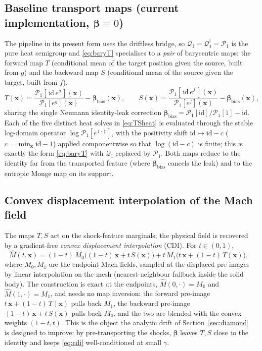 \documentclass[11pt]{article}
\theoremstyle{remark}
\newcommand{\xv}{\mathbf{x}}
\newcommand{\bt}{\boldsymbol{\beta}}
\begin{document}
\subsection{Baseline transport maps (current implementation, $\bt\equiv0$)}
\label{sec:baseline}
The pipeline in its present form uses the driftless bridge, so
$\mathcal{Q}_1=\mathcal{Q}_1^{\dagger}=\mathcal{P}_1$ is the pure heat semigroup and
\eqref{eq:baryT} specialises to a \emph{pair} of barycentric maps: the forward map
$T$ (conditional mean of the target position given the source, built from $g$) and
the backward map $S$ (conditional mean of the source given the target, built from
$f$),
\begin{equation}
\label{eq:TSheat}
T(\xv)=\frac{\mathcal{P}_1[\,\mathrm{id}\,e^{g}\,](\xv)}{\mathcal{P}_1[e^{g}](\xv)}-\boldsymbol{\beta}_{\mathrm{bias}}(\xv),
\qquad
S(\xv)=\frac{\mathcal{P}_1[\,\mathrm{id}\,e^{f}\,](\xv)}{\mathcal{P}_1[e^{f}](\xv)}-\boldsymbol{\beta}_{\mathrm{bias}}(\xv),
\end{equation}
sharing the single Neumann identity-leak correction
$\boldsymbol{\beta}_{\mathrm{bias}}=\mathcal{P}_1[\mathrm{id}]/\mathcal{P}_1[1]-\mathrm{id}$.
Each of the five distinct heat solves in \eqref{eq:TSheat} is evaluated through the
stable log-domain operator $\log\mathcal{P}_1[e^{(\cdot)}]$, with the positivity
shift $\mathrm{id}\mapsto\mathrm{id}-c$ ($c=\min_\xv\mathrm{id}-1$) applied
componentwise so that $\log(\mathrm{id}-c)$ is finite; this is exactly the form
\eqref{eq:baryT} with $\mathcal{Q}_1$ replaced by $\mathcal{P}_1$. Both maps reduce
to the identity far from the transported feature (where $\boldsymbol{\beta}_{\mathrm{bias}}$
cancels the leak) and to the entropic Monge map on its support.

\subsection{Convex displacement interpolation of the Mach field}
\label{sec:cdi}
The maps $T,S$ act on the shock-feature marginals; the physical field is recovered
by a gradient-free \emph{convex displacement interpolation} (CDI). For $t\in(0,1)$,
\begin{equation}
\label{eq:cdi}
\widehat M(t,\xv)=(1-t)\,M_0\!\bigl((1-t)\,\xv+t\,S(\xv)\bigr)
                 +t\,M_1\!\bigl(t\,\xv+(1-t)\,T(\xv)\bigr),
\end{equation}
where $M_0,M_1$ are the endpoint Mach fields, sampled at the displaced pre-images by
linear interpolation on the mesh (nearest-neighbour fallback inside the solid body).
The construction is exact at the endpoints, $\widehat M(0,\cdot)=M_0$ and
$\widehat M(1,\cdot)=M_1$, and needs no map inversion: the forward pre-image
$t\,\xv+(1-t)\,T(\xv)$ pulls back $M_1$, the backward pre-image
$(1-t)\,\xv+t\,S(\xv)$ pulls back $M_0$, and the two are blended with the convex
weights $(1-t,t)$. This is the object the analytic drift of
Section~\ref{sec:diamond} is designed to improve: by pre-transporting the shocks,
$\bt$ leaves $T,S$ close to the identity and keeps \eqref{eq:cdi} well-conditioned
at small $\gamma$.
\end{document}
